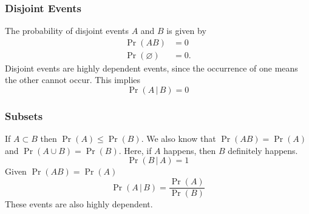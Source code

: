 \documentclass{article}
\begin{document}
\subsubsection{Disjoint Events}
\begin{theorem}
    The probability of disjoint events \(A\) and \(B\) is given by
    \begin{align*}
        \Pr{\left( AB \right)}          & = 0  \\
        \Pr{\left( \varnothing \right)} & = 0.
    \end{align*}
    Disjoint events are highly dependent events, since the occurrence of one means the other cannot occur.
    This implies
    \begin{equation*}
        \Pr{\left( A \,\vert\, B \right)} = 0
    \end{equation*}
\end{theorem}
\subsubsection{Subsets}
\begin{theorem}
    If \(A \subset B\) then \(\Pr{\left( A \right)} \leq \Pr{\left( B \right)}\).
    We also know that \(\Pr{\left( AB \right)} = \Pr{\left( A \right)}\) and \(\Pr{\left( A \cup B \right)} = \Pr{\left( B \right)}\).
    Here, if \(A\) happens, then \(B\) definitely happens.
    \begin{equation*}
        \Pr{\left( B \,\vert\, A \right)} = 1
    \end{equation*}
    Given \(\Pr{\left( AB \right)} = \Pr{\left( A \right)}\)
    \begin{equation*}
        \Pr{\left( A \,\vert\, B \right)} = \frac{\Pr{\left( A \right)}}{\Pr{\left( B \right)}}
    \end{equation*}
    These events are also highly dependent.
\end{theorem}
\end{document}
